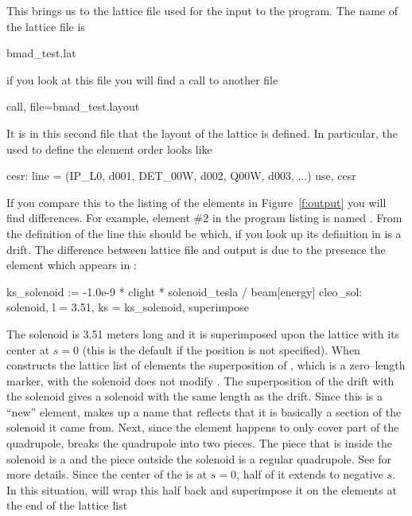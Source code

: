 {{{{{{{{{{This brings us to the lattice file used for the input to the program.
The name of the lattice file is 
  \begin{example}
  bmad_test.lat
  \end{example} 
if you look at this file you will find a call to another file
  \begin{example}
  call, file=bmad_test.layout
  \end{example}
It is in this second file
that the layout of the lattice is defined. In particular, the  used
to define the element order looks like
\begin{example}
  cesr: line = (IP_L0, d001, DET_00W, d002, Q00W, d003, ...)
  use, cesr
\end{example}
If you compare this to the listing of the elements in
Figure~\ref{f:output} you will find differences. For example, element
\#2 in the program listing is named . From the
definition of the  line this should be  which, if
you look up its definition in  is a drift.  The
difference between lattice file and output is due to the presence
the  element which appears in :
\begin{example}
  ks_solenoid    := -1.0e-9 * clight * solenoid_tesla / beam[energy]
  cleo_sol: solenoid, l = 3.51, ks = ks_solenoid, superimpose 
\end{example}
The solenoid is 3.51 meters long
and it is superimposed upon the lattice with its center at $s = 0$ (this
is the default if the position is not specified). 
When  constructs the lattice list of elements
the superposition of , which is a zero--length marker, with the
solenoid does not modify . The superposition of the
 drift with the solenoid gives a solenoid with the same
length as the drift. Since this is a ``new'' element, 
makes up a name that reflects that it is basically a section of the
solenoid it came from.  Next, since the  element happens to
only cover
part of the  quadrupole,  breaks the
quadrupole into two pieces. The piece that is inside the solenoid is a
 and the piece outside the solenoid is a regular
quadrupole. See  for more details. Since the
center of the  is at $s = 0$, half of it extends to
negative $s$. In this situation,  will wrap this half
back and superimpose it on the elements at the end of the lattice list
}}}}}}}}}}
